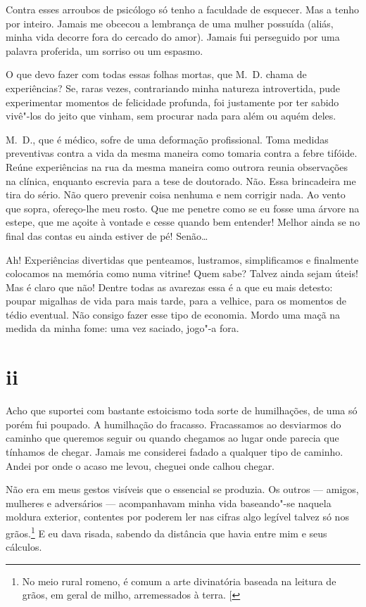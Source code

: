 Contra esses arroubos de psicólogo só tenho a faculdade de esquecer. Mas
a tenho por inteiro. Jamais me obcecou a lembrança de uma mulher
possuída (aliás, minha vida decorre fora do cercado do amor).
Jamais fui perseguido por uma palavra proferida, um sorriso ou
um espasmo.

O que devo fazer com todas essas folhas mortas, que M.~D. chama de
experiências? Se, raras vezes, contrariando minha natureza
introvertida, pude experimentar momentos de felicidade profunda, foi
justamente por ter sabido vivê"-los do jeito que vinham, sem procurar
nada para além ou aquém deles.

M.~D., que é médico, sofre de uma deformação profissional. Toma medidas
preventivas contra a vida da mesma maneira como tomaria contra a febre
tifóide. Reúne experiências na rua da mesma maneira como outrora reunia
observações na clínica, enquanto escrevia para a tese de doutorado. Não.
Essa brincadeira me tira do sério. Não quero prevenir coisa nenhuma e
nem corrigir nada. Ao vento que sopra, ofereço-lhe meu rosto.
Que me penetre como se eu fosse uma árvore na estepe, que me açoite à
vontade e cesse quando bem entender! Melhor ainda se no final das
contas eu ainda estiver de pé! Senão\ldots{}

Ah! Experiências divertidas que penteamos, lustramos, simplificamos e
finalmente colocamos na memória como numa vitrine! Quem sabe? Talvez
ainda sejam úteis! Mas é claro que não! Dentre
todas as avarezas essa é a que eu mais detesto: poupar migalhas de vida
para mais tarde, para a velhice, para os momentos de tédio eventual. Não
consigo fazer esse tipo de economia. Mordo uma maçã na medida da minha
fome: uma vez saciado, jogo"-a fora.

\section{ii}

Acho que suportei com bastante estoicismo toda sorte de humilhações, de
uma só porém fui poupado. A humilhação do fracasso. Fracassamos ao
desviarmos do caminho que queremos seguir ou quando chegamos ao lugar
onde parecia que tínhamos de chegar. Jamais me considerei
fadado a qualquer tipo de caminho. Andei por onde o acaso me levou,
cheguei onde calhou chegar.

Não era em meus gestos visíveis que o essencial se produzia. Os outros ---
amigos, mulheres e adversários --- acompanhavam minha vida baseando"-se
naquela moldura exterior, contentes por poderem ler nas cifras algo
legível talvez só nos grãos.\footnote{No meio
rural romeno, é comum a arte divinatória baseada na leitura de grãos, em
geral de milho, arremessados à terra. {[}\versal{N.~T.}{]}} E eu dava risada, sabendo da distância
que havia entre mim e seus cálculos.

